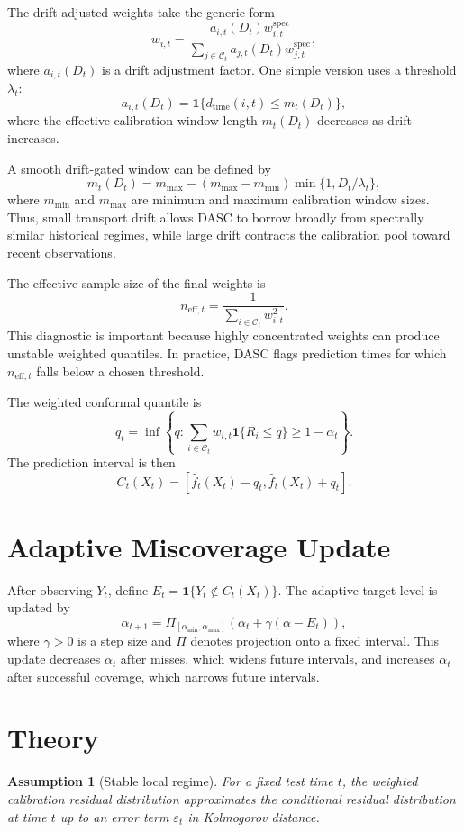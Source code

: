 \documentclass[11pt]{article}
\newtheorem{assumption}{Assumption}
\begin{document}
The drift-adjusted weights take the generic form
\[
    w_{i,t}
    =
    \frac{a_{i,t}(D_t) w^{\mathrm{spec}}_{i,t}}
    {\sum_{j\in\mathcal{C}_t} a_{j,t}(D_t) w^{\mathrm{spec}}_{j,t}},
\]
where $a_{i,t}(D_t)$ is a drift adjustment factor. One simple version uses a threshold $\lambda_t$:
\[
    a_{i,t}(D_t)
    =
    \mathbf{1}\{d_{\mathrm{time}}(i,t)\leq m_t(D_t)\},
\]
where the effective calibration window length $m_t(D_t)$ decreases as drift increases.

A smooth drift-gated window can be defined by
\[
    m_t(D_t)
    =
    m_{\max}
    -
    (m_{\max}-m_{\min})
    \min\{1,D_t/\lambda_t\},
\]
where $m_{\min}$ and $m_{\max}$ are minimum and maximum calibration window sizes. Thus, small transport drift allows DASC to borrow broadly from spectrally similar historical regimes, while large drift contracts the calibration pool toward recent observations.

The effective sample size of the final weights is
\[
    n_{\mathrm{eff},t}
    =
    \frac{1}{\sum_{i\in\mathcal{C}_t} w_{i,t}^2}.
\]
This diagnostic is important because highly concentrated weights can produce unstable weighted quantiles. In practice, DASC flags prediction times for which $n_{\mathrm{eff},t}$ falls below a chosen threshold.

The weighted conformal quantile is
\[
    q_t = \inf\left\{q:\sum_{i\in\mathcal{C}_t} w_{i,t}\mathbf{1}\{R_i\leq q\}\geq 1-\alpha_t\right\}.
\]
The prediction interval is then
\[
    C_t(X_t) = [\widehat f_t(X_t)-q_t,\widehat f_t(X_t)+q_t].
\]

\section{Adaptive Miscoverage Update}

After observing $Y_t$, define $E_t=\mathbf{1}\{Y_t\notin C_t(X_t)\}$. The adaptive target level is updated by
\[
    \alpha_{t+1}
    =
    \Pi_{[\alpha_{\min},\alpha_{\max}]}
    \left(\alpha_t+\gamma(\alpha-E_t)\right),
\]
where $\gamma>0$ is a step size and $\Pi$ denotes projection onto a fixed interval. This update decreases $\alpha_t$ after misses, which widens future intervals, and increases $\alpha_t$ after successful coverage, which narrows future intervals.

\section{Theory}

\begin{assumption}[Stable local regime]
For a fixed test time $t$, the weighted calibration residual distribution approximates the conditional residual distribution at time $t$ up to an error term $\varepsilon_t$ in Kolmogorov distance.
\end{assumption}
\end{document}
